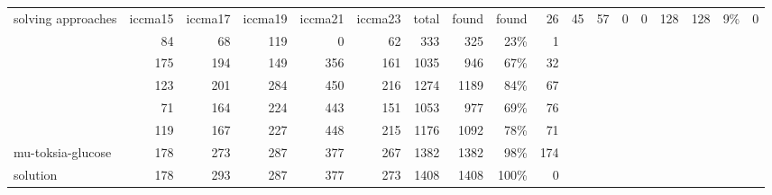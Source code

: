 \begin{tabular}{lrrrrrrrrr}
\toprule
solving approaches & iccma15 & iccma17 & iccma19 & iccma21 & iccma23 & total & found & found %
\midrule
{} & 26 & 45 & 57 & 0 & 0 & 128 & 128 & 9\% & 0 \\
 & 84 & 68 & 119 & 0 & 62 & 333 & 325 & 23\% & 1 \\
 & 175 & 194 & 149 & 356 & 161 & 1035 & 946 & 67\% & 32 \\
 & 123 & 201 & 284 & 450 & 216 & 1274 & 1189 & 84\% & 67 \\
 & 71 & 164 & 224 & 443 & 151 & 1053 & 977 & 69\% & 76 \\
 & 119 & 167 & 227 & 448 & 215 & 1176 & 1092 & 78\% & 71 \\
mu-toksia-glucose & 178 & 273 & 287 & 377 & 267 & 1382 & 1382 & 98\% & 174 \\
\midrule
solution & 178 & 293 & 287 & 377 & 273 & 1408 & 1408 & 100\% & 0 \\
\bottomrule
\end{tabular}
